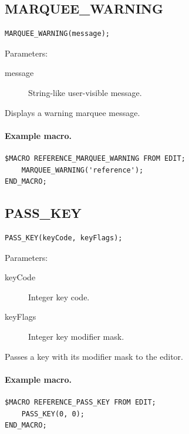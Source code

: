 \documentclass[a4paper,10pt,twoside,openany]{book}
\newenvironment{mrmacextension}{\begin{changebar}}{\end{changebar}}
\begin{document}
\begin{mrmacextension}
\label{prim:procedure-marquee-warning}
\subsection*{MARQUEE\_WARNING}
\begin{verbatim}
MARQUEE_WARNING(message);
\end{verbatim}
Parameters:
\begin{description}
\item[message] String-like user-visible message.
\end{description}

Displays a warning marquee message.

\paragraph{Example macro.}
\begin{verbatim}
$MACRO REFERENCE_MARQUEE_WARNING FROM EDIT;
    MARQUEE_WARNING('reference');
END_MACRO;
\end{verbatim}
\end{mrmacextension}

\label{prim:procedure-pass-key}
\subsection*{PASS\_KEY}
\begin{verbatim}
PASS_KEY(keyCode, keyFlags);
\end{verbatim}
Parameters:
\begin{description}
\item[keyCode] Integer key code.
\item[keyFlags] Integer key modifier mask.
\end{description}

Passes a key with its modifier mask to the editor.

\paragraph{Example macro.}
\begin{verbatim}
$MACRO REFERENCE_PASS_KEY FROM EDIT;
    PASS_KEY(0, 0);
END_MACRO;
\end{verbatim}

\label{prim:procedure-play-key-macro}
\end{document}
